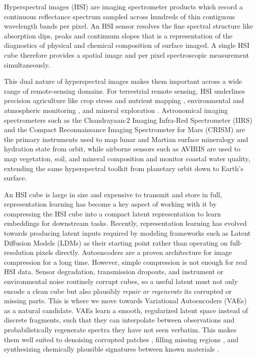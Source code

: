 \documentclass[twoside,11pt]{article}
\begin{document}
Hyperspectral images (HSI) are imaging spectrometer products which record a continuous reflectance spectrum sampled across hundreds of thin contiguous wavelength bands per pixel. An HSI sensor resolves the fine spectral structure like absorption dips, peaks and continuum slopes that is a representation of the diagnostics of physical and chemical composition of surface imaged. A single HSI cube therefore provides a spatial image and per pixel spectroscopic measurement simultaneously.

This dual nature of hyperspectral images makes them important across a wide range of remote-sensing domains. For terrestrial remote sensing, HSI underlines precision agriculture like crop stress and nutrient mapping \citep{wang2024npk}, environmental and atmospheric monitoring \citep{stuart2019environmental}, and mineral exploration \citep{bedini2017mineral}. Astronomical imaging spectrometers such as the Chandrayaan-2 Imaging Infra-Red Spectrometer (IIRS) \citep{chowdhury2020iirs} and the Compact Reconnaissance Imaging Spectrometer for Mars (CRISM) \citep{murchie2007crism} are the primary instruments used to map lunar and Martian surface mineralogy and hydration state from orbit, while airborne sensors such as AVIRIS \citep{green1998aviris} are used to map vegetation, soil, and mineral composition and monitor coastal water quality, extending the same hyperspectral toolkit from planetary orbit down to Earth's surface.

An HSI cube is large in size and expensive to transmit and store in full, representation learning has become a key aspect of working with it by compressing the HSI cube into a compact latent representation to learn embeddings for downstream tasks. Recently, representation learning has evolved towards producing latent inputs required by modeling frameworks such as Latent Diffusion Models (LDMs) \citep{rombach2022ldm} as their starting point rather than operating on full-resolution pixels directly. Autoencoders \citep{hinton2006reducing} are a proven architecture for image compression for a long time. However, simple compression is not enough for real HSI data. Sensor degradation, transmission dropouts, and instrument or environmental noise routinely corrupt cubes, so a useful latent must not only encode a clean cube but also plausibly \emph{repair or regenerate} its corrupted or missing parts. This is where we move towards Variational Autoencoders (VAEs) \citep{kingma2014vae} as a natural candidate. VAEs learn a smooth, regularized latent space instead of discrete fragments, such that they can interpolate between observations and probabilistically regenerate spectra they have not seen verbatim. This makes them well suited to denoising corrupted patches \citep{im2017denoising}, filling missing regions \citep{peng2021inpainting}, and synthesizing chemically plausible signatures between known materials \citep{gomezbombarelli2018chemical}.
\end{document}
